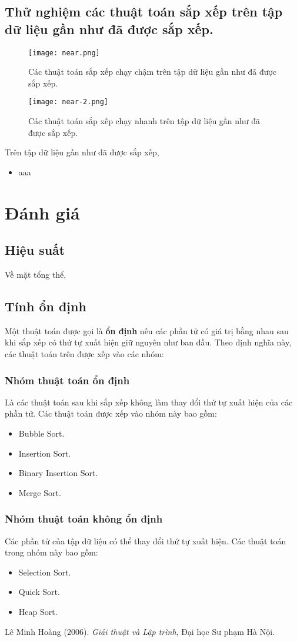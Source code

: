 \documentclass[]{article}
\begin{document}
\subsection{Thử nghiệm các thuật toán sắp xếp trên tập dữ liệu gần như đã được sắp xếp.}
\begin{figure}[H]
\centering
\texttt{[image: near.png]}
\caption{Các thuật toán sắp xếp chạy chậm trên tập dữ liệu gần như đã được sắp xếp.}
\end{figure}
\begin{figure}[H]
\centering
\texttt{[image: near-2.png]}
\caption{Các thuật toán sắp xếp chạy nhanh trên tập dữ liệu gần như đã được sắp xếp.}
\end{figure}
Trên tập dữ liệu gần như đã được sắp xếp,
\begin{itemize}
\item aaa
\end{itemize}

\section{Đánh giá}
\subsection{Hiệu suất}
Về mặt tổng thể,

\subsection{Tính ổn định}
Một thuật toán được gọi là \textbf{ổn định} nếu các phần tử có giá trị bằng nhau sau khi sắp xếp có thứ tự xuất hiện giữ nguyên như ban đầu. Theo định nghĩa này, các thuật toán trên được xếp vào các nhóm:

\subsubsection{Nhóm thuật toán ổn định}
Là các thuật toán sau khi sắp xếp không làm thay đổi thứ tự xuất hiện của các phần tử. Các thuật toán được xếp vào nhóm này bao gồm:
\begin{itemize}
\item Bubble Sort.
\item Insertion Sort.
\item Binary Insertion Sort.
\item Merge Sort.
\end{itemize}

\subsubsection{Nhóm thuật toán không ổn định}
Các phần tử của tập dữ liệu có thể thay đổi thứ tự xuất hiện. Các thuật toán trong nhóm này bao gồm:
\begin{itemize}
\item Selection Sort.
\item Quick Sort.
\item Heap Sort.
\end{itemize}

\medskip

\begin{thebibliography}{10}
Lê Minh Hoàng (2006).
\textit{Giải thuật và Lập trình}, Đại học Sư phạm Hà Nội.
\end{thebibliography}
\end{document}
